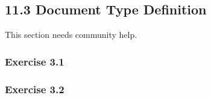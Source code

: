 \documentclass[../../main.tex]{subfiles}
\begin{document}
\subsection{11.3 Document Type Definition}

This section needs community help.

\subsubsection*{Exercise 3.1}

\subsubsection*{Exercise 3.2}
\end{document}
